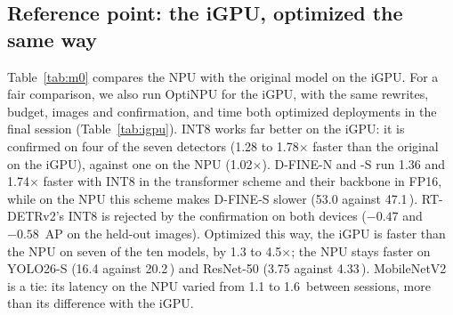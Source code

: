 \documentclass[conference]{IEEEtran}
\newcommand{\tool}{OptiNPU}
\newcommand{\ms}{\,\text{ms}}
\begin{document}
\subsection{Reference point: the iGPU, optimized the same way}
\label{sec:eval-igpu}

Table~\ref{tab:m0} compares the NPU with the original model on the iGPU. For a fair comparison, we also run \tool{} for the iGPU, with the same rewrites, budget, images and confirmation, and time both optimized deployments in the final session (Table~\ref{tab:igpu}). INT8 works far better on the iGPU: it is confirmed on four of the seven detectors (1.28 to 1.78$\times$ faster than the original on the iGPU), against one on the NPU (1.02$\times$). D-FINE-N and -S run 1.36 and 1.74$\times$ faster with INT8 in the transformer scheme and their backbone in FP16, while on the NPU this scheme makes D-FINE-S slower (53.0 against 47.1\ms{}). RT-DETRv2's INT8 is rejected by the confirmation on both devices ($-0.47$ and $-0.58$~AP on the held-out images). Optimized this way, the iGPU is faster than the NPU on seven of the ten models, by 1.3 to 4.5$\times$; the NPU stays faster on YOLO26-S (16.4 against 20.2\ms{}) and ResNet-50 (3.75 against 4.33\ms{}). MobileNetV2 is a tie: its latency on the NPU varied from 1.1 to 1.6\ms{} between sessions, more than its difference with the iGPU.
\end{document}

